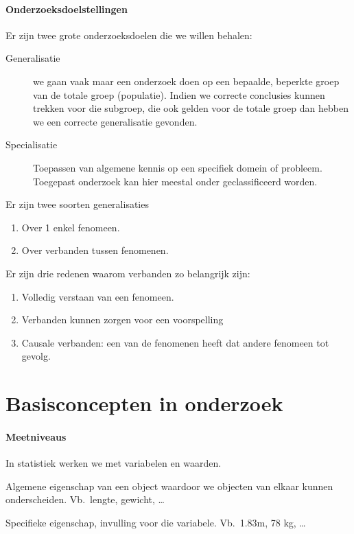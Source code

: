 \paragraph{Onderzoeksdoelstellingen}

Er zijn twee grote onderzoeksdoelen die we willen behalen:

\begin{description}
	\item [Generalisatie] we gaan vaak maar een onderzoek doen op een bepaalde, beperkte groep van de totale groep (populatie). Indien we correcte conclusies kunnen trekken voor die subgroep, die ook gelden voor de totale groep dan hebben we een correcte generalisatie gevonden.
    \item[Specialisatie] Toepassen van algemene kennis op een specifiek domein of probleem. Toegepast onderzoek kan hier meestal onder geclassificeerd worden.
\end{description}

Er zijn twee soorten generalisaties
\begin{enumerate}
	\item Over 1 enkel fenomeen.
	\item Over verbanden tussen fenomenen.
\end{enumerate}
Er zijn drie redenen waarom verbanden zo belangrijk zijn:
\begin{enumerate}
	\item Volledig verstaan van een fenomeen. 
	\item Verbanden kunnen zorgen voor een voorspelling
	\item Causale verbanden: een van de fenomenen heeft dat andere fenomeen tot gevolg. 
\end{enumerate}

	
\section{Basisconcepten in onderzoek}
\paragraph{Meetniveaus}
In statistiek werken we met variabelen en waarden.

\begin{definition}[Variabele] 
    Algemene eigenschap van een object waardoor we objecten van elkaar kunnen onderscheiden. Vb.~lengte, gewicht, \ldots
\end{definition}  
\begin{definition}[Waarde]
    Specifieke eigenschap, invulling voor die variabele. Vb.~1.83m, 78 kg, \ldots
\end{definition}


